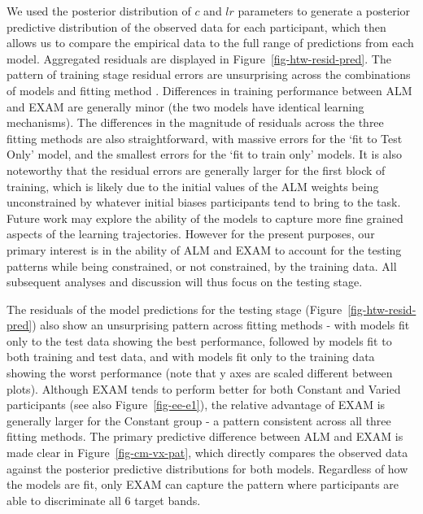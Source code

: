 \documentclass[
  12pt,
  letterpaper,
]{article}
\begin{document}
We used the posterior distribution of \(c\) and \(lr\) parameters to
generate a posterior predictive distribution of the observed data for
each participant, which then allows us to compare the empirical data to
the full range of predictions from each model. Aggregated residuals are
displayed in Figure~\ref{fig-htw-resid-pred}. The pattern of training
stage residual errors are unsurprising across the combinations of models
and fitting method . Differences in training performance between ALM and
EXAM are generally minor (the two models have identical learning
mechanisms). The differences in the magnitude of residuals across the
three fitting methods are also straightforward, with massive errors for
the `fit to Test Only' model, and the smallest errors for the `fit to
train only' models. It is also noteworthy that the residual errors are
generally larger for the first block of training, which is likely due to
the initial values of the ALM weights being unconstrained by whatever
initial biases participants tend to bring to the task. Future work may
explore the ability of the models to capture more fine grained aspects
of the learning trajectories. However for the present purposes, our
primary interest is in the ability of ALM and EXAM to account for the
testing patterns while being constrained, or not constrained, by the
training data. All subsequent analyses and discussion will thus focus on
the testing stage.

The residuals of the model predictions for the testing stage
(Figure~\ref{fig-htw-resid-pred}) also show an unsurprising pattern
across fitting methods - with models fit only to the test data showing
the best performance, followed by models fit to both training and test
data, and with models fit only to the training data showing the worst
performance (note that y axes are scaled different between plots).
Although EXAM tends to perform better for both Constant and Varied
participants (see also Figure~\ref{fig-ee-e1}), the relative advantage
of EXAM is generally larger for the Constant group - a pattern
consistent across all three fitting methods. The primary predictive
difference between ALM and EXAM is made clear in
Figure~\ref{fig-cm-vx-pat}, which directly compares the observed data
against the posterior predictive distributions for both models.
Regardless of how the models are fit, only EXAM can capture the pattern
where participants are able to discriminate all 6 target bands.
\end{document}
